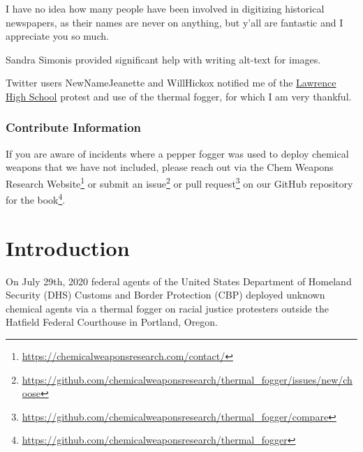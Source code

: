 \documentclass[
  12pt,
]{krantz}
\renewcommand{\href}[2]{#2\footnote{\url{#1}}}
\begin{document}
I have no idea how many people have been involved in digitizing historical newspapers, as their names are never on anything, but y'all are fantastic and I appreciate you so much.

Sandra Simonis provided significant help with writing alt-text for images.

Twitter users NewNameJeanette and WillHickox notified me of the \protect\hyperlink{Lawrence1970_04_21}{Lawrence High School} protest and use of the thermal fogger, for which I am very thankful.

\hypertarget{contribute-information}{%
\subsection*{Contribute Information}\label{contribute-information}}


If you are aware of incidents where a pepper fogger was used to deploy chemical weapons that we have not included, please reach out \href{https://chemicalweaponsresearch.com/contact/}{via the Chem Weapons Research Website} or submit an \href{https://github.com/chemicalweaponsresearch/thermal_fogger/issues/new/choose}{issue} or \href{https://github.com/chemicalweaponsresearch/thermal_fogger/compare}{pull request} on our \href{https://github.com/chemicalweaponsresearch/thermal_fogger}{GitHub repository for the book}.

\mainmatter

\hypertarget{introduction}{%
\chapter*{Introduction}\label{introduction}}


On July 29th, 2020 federal agents of the United States Department of Homeland Security (DHS) Customs and Border Protection (CBP) deployed unknown chemical agents via a thermal fogger on racial justice protesters outside the Hatfield Federal Courthouse in Portland, Oregon.
\end{document}
